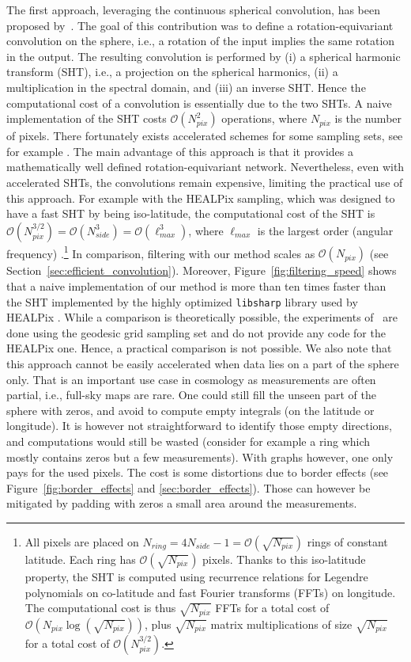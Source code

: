 \documentclass[final,twocolumn,3p,times,authoryear]{elsarticle}
\newcommand{\figref}[1]{Figure~\ref{fig:#1}}
\newcommand{\secref}[1]{Section~\ref{sec:#1}}
\newcommand{\1}{\b{1}}              %
\newcommand{\0}{\b{0}}              %
\newcommand{\bO}{\mathcal{O}}
\newcommand{\pkg}[1]{\texttt{#1}}
\begin{document}
The first approach, leveraging the continuous spherical convolution, has been proposed by~\citet{cohen2018spherical}. The goal of this contribution was to define a rotation-equivariant convolution on the sphere, i.e., a rotation of the input implies the same rotation in the output.
The resulting convolution is performed by (i) a spherical harmonic transform (SHT), i.e., a projection on the spherical harmonics, (ii) a  multiplication in the spectral domain, and (iii) an inverse SHT. Hence the computational cost of a convolution is essentially due to the two SHTs. A naive implementation of the SHT costs $\bO(N_{pix}^2)$ operations, where $N_{pix}$ is the number of pixels. There fortunately exists accelerated schemes for some sampling sets, see for example \citet{mohlenkamp1999fast, rokhlin2006fast, reinecke2013libsharp}.
The main advantage of this approach is that it provides a mathematically well defined rotation-equivariant network. Nevertheless, even with accelerated SHTs, the convolutions remain expensive, limiting the practical use of this approach.
For example with the HEALPix sampling, which was designed to have a fast SHT by being iso-latitude, the computational cost of the SHT is $\bO(N_{pix}^{3/2}) = \bO(N_{side}^3) = \bO(\ell_{max}^3)$, where $\ell_{max}$ is the largest order (angular frequency) \citep{gorski2005healpix, reinecke2013libsharp}.\footnote{All pixels are placed on $N_{ring} = 4N_{side}-1 = \bO(\sqrt{N_{pix}})$ rings of constant latitude. Each ring has $\bO(\sqrt{N_{pix}})$ pixels. Thanks to this iso-latitude property, the SHT is computed using recurrence relations for Legendre polynomials on co-latitude and fast Fourier transforms (FFTs) on longitude. The computational cost is thus $\sqrt{N_{pix}}$ FFTs for a total cost of $\bO(N_{pix} \log(\sqrt{N_{pix}}))$, plus $\sqrt{N_{pix}}$ matrix multiplications of size $\sqrt{N_{pix}}$ for a total cost of $\bO(N_{pix}^{3/2})$.}
In comparison, filtering with our method scales as $\bO(N_{pix})$ (see \secref{efficient_convolution}). Moreover, \figref{filtering_speed} shows that a naive implementation of our method is more than ten times faster than the SHT implemented by the highly optimized \pkg{libsharp} library used by HEALPix \citep{reinecke2013libsharp}.
While a comparison is theoretically possible, the experiments of~\cite{cohen2018spherical} are done using the geodesic grid sampling set and do not provide any code for the HEALPix one. Hence, a practical comparison is not possible.
We also note that this approach cannot be easily accelerated when data lies on a part of the sphere only. That is an important use case in cosmology as measurements are often partial, i.e., full-sky maps are rare. One could still fill the unseen part of the sphere with zeros, and avoid to compute empty integrals (on the latitude or longitude). It is however not straightforward to identify those empty directions, and computations would still be wasted (consider for example a ring which mostly contains zeros but a few measurements). With graphs however, one only pays for the used pixels. The cost is some distortions due to border effects (see \figref{border_effects} and \ref{sec:border_effects}). Those can however be mitigated by padding with zeros a small area around the measurements.
\end{document}
